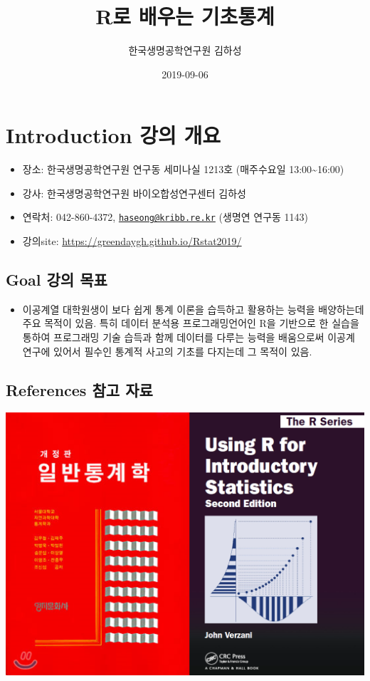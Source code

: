 \documentclass[]{book}
\title{R로 배우는 기초통계}
\author{한국생명공학연구원 김하성}
\date{2019-09-06}
\providecommand{\tightlist}{%
  \setlength{\itemsep}{0pt}\setlength{\parskip}{0pt}}
\begin{document}
\maketitle

{
\setcounter{tocdepth}{1}
\tableofcontents
}
\hypertarget{introduction--}{%
\chapter{Introduction 강의 개요}\label{introduction--}}

\begin{itemize}
\tightlist
\item
  장소: 한국생명공학연구원 연구동 세미나실 1213호 (매주수요일 13:00\textasciitilde{}16:00)
\item
  강사: 한국생명공학연구원 바이오합성연구센터 김하성
\item
  연락처: 042-860-4372, \href{mailto:haseong@kribb.re.kr}{\nolinkurl{haseong@kribb.re.kr}} (생명연 연구동 1143)
\item
  강의site: \url{https://greendaygh.github.io/Rstat2019/}
\end{itemize}

\hypertarget{goal--}{%
\section{Goal 강의 목표}\label{goal--}}

\begin{itemize}
\tightlist
\item
  이공계열 대학원생이 보다 쉽게 통계 이론을 습득하고 활용하는 능력을 배양하는데 주요 목적이 있음. 특히 데이터 분석용 프로그래밍언어인 R을 기반으로 한 실습을 통하여 프로그래밍 기술 습득과 함께 데이터를 다루는 능력을 배움으로써 이공계 연구에 있어서 필수인 통계적 사고의 기초를 다지는데 그 목적이 있음.
\end{itemize}

\hypertarget{references--}{%
\section{References 참고 자료}\label{references--}}

\includegraphics{images/01-15.PNG}
\end{document}
